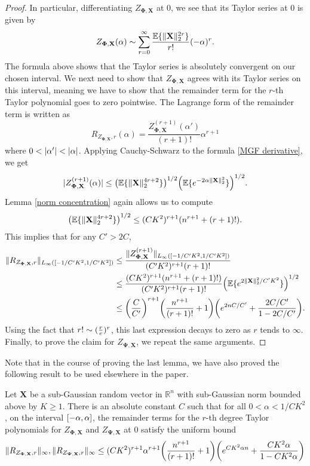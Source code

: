 \documentclass[final,12pt]{colt2018} %
\numberwithin{equation}{section}
\DeclarePairedDelimiter{\abs}{\lvert}{\rvert}
\DeclarePairedDelimiter{\norm}{\lVert}{\rVert}
\DeclarePairedDelimiter{\paren}{(}{)}
\DeclarePairedDelimiter{\braces}{\lbrace}{\rbrace}
\DeclarePairedDelimiter{\sqbracket}{[}{]}
\newcommand{\E}{\mathbb{E}}
\newcommand{\R}{\mathbb{R}}
\newcommand{\boldPhi}{\boldsymbol{\Phi}}
\newcommand{\boldPsi}{\boldsymbol{\Psi}}
\newcommand{\boldX}{\textbf{X}}
\begin{document}
\begin{proof}
	In particular, differentiating $Z_{\boldPhi,\boldX}$ at 0, we see that its Taylor series at 0 is given by
	\begin{align}
	Z_{\boldPhi,\boldX}(\alpha) \sim \sum_{r=0}^\infty\frac{\E\braces{\norm{\boldX}^{2r}_2}}{r!}(-\alpha)^r.
	\end{align}
	The formula above shows that the Taylor series is absolutely convergent on our chosen interval. We next need to show that $Z_{\boldPhi,\boldX}$ agrees with its Taylor series on this interval, meaning we have to show that the remainder term for the $r$-th Taylor polynomial goes to zero pointwise. The Lagrange form of the remainder term is written as
	\[
	R_{Z_{\boldPhi,\boldX},r}(\alpha) = \frac{Z_{\boldPhi,\boldX}^{(r+1)}(\alpha')}{(r+1)!}\alpha^{r+1}
	\]
	where $0 < \abs{\alpha'} < \abs{\alpha}$. Applying Cauchy-Schwarz to the formula \eqref{MGF derivative}, we get
	\begin{align}
	\abs{Z_{\boldPhi,\boldX}^{(r+1)}(\alpha)} \leq \paren*{\E\braces{\norm{\boldX}_2^{4r+2}}}^{1/2}\paren*{\E\braces{e^{-2\alpha\norm{\boldX}_2^2}}}^{1/2}.
	\end{align}
	Lemma \ref{norm concentration} again allows us to compute
	\[
	\paren*{\E\braces{\norm{\boldX}_2^{4r+2}}}^{1/2} \leq (CK^2)^{r+1}\paren{n^{r+1}+(r+1)!}.
	\]
	This implies that for any $C' > 2C$,
	\begin{align*}
	\norm{R_{Z_{\boldPhi,\boldX},r}}_{L_\infty([-1/C'K^2,1/C'K^2])} & \leq \frac{\norm{Z_{\boldPhi,\boldX}^{(r+1)}}_{L_\infty([-1/C'K^2,1/C'K^2])}}{(C'K^2)^{r+1}(r+1)!} \\
	& \leq \frac{(CK^2)^{r+1}\paren{n^{r+1}+(r+1)!}}{(C'K^2)^{r+1}(r+1)!}\paren*{\E\braces{e^{2\norm{\boldX}_2^2/C'K^2}}}^{1/2}  \\
	& \leq \paren*{\frac{C}{C'}}^{r+1}\paren*{\frac{n^{r+1}}{(r+1)!}+1} \paren*{e^{2nC/C'} + \frac{2C/C'}{1-2C/C'}}.
	\end{align*}
	Using the fact that $r! \sim \paren{\frac{r}{e}}^r$, this last expression decays to zero as $r$ tends to $\infty$. Finally, to prove the claim for $Z_{\boldPsi,\boldX}$, we repeat the same arguments.
\end{proof}

Note that in the course of proving the last lemma, we have also proved the following result to be used elsewhere in the paper.

\begin{lemma}[Taylor remainder terms for $Z_{\boldPhi,\boldX}$ and $Z_{\boldPsi,\boldX}$] \label{MGF remainder}
	Let $\boldX$ be a sub-Gaussian random vector in $\R^n$ with sub-Gaussian norm bounded above by $K \geq 1$. There is an absolute constant $C$ such that for all $0 < \alpha < 1/CK^2$, on the interval $\sqbracket*{-\alpha,\alpha}$, the remainder terms for the $r$-th degree Taylor polynomials for $Z_{\boldPhi,\boldX}$ and $Z_{\boldPsi,\boldX}$ at 0 satisfy the uniform bound
	\begin{align}
	\norm{R_{Z_{\boldPhi,\boldX},r}}_{\infty}, \norm{R_{Z_{\boldPsi,\boldX},r}}_{\infty}\leq (CK^2)^{r+1}\alpha^{r+1}\paren*{\frac{n^{r+1}}{(r+1)!}+1} \paren*{e^{CK^2\alpha n} + \frac{CK^2\alpha}{1-CK^2\alpha}}
	\end{align}
\end{lemma}
\end{document}

